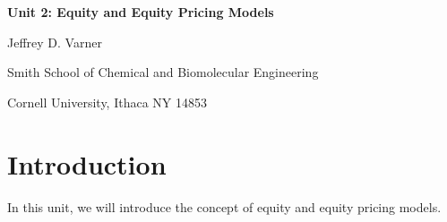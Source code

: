 \documentclass[11pt]{article}
\theoremstyle{definition}
\begin{document}
{\par\centering\textbf{\Large Unit 2: Equity and Equity Pricing Models}}
\vspace{0.2in}
{\par \centering \large{Jeffrey D. Varner}}
\vspace{0.05in}
{\par \centering \large{Smith School of Chemical and Biomolecular Engineering}}
{\par \centering \large{Cornell University, Ithaca NY 14853}}

\date{}
\thispagestyle{empty}

\setcounter{page}{1}

\section{Introduction}
In this unit, we will introduce the concept of equity and equity pricing models. 
\end{document}
